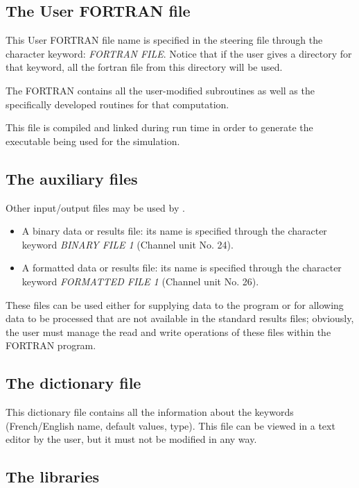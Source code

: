 \subsection{ The User FORTRAN file}

 This User FORTRAN file name is specified in the steering file through the character keyword: \textit{FORTRAN FILE}. Notice that if the user gives a directory for that keyword, all the fortran file from this directory will be used.  

 The FORTRAN contains all the user-modified \tomawac subroutines as well as the specifically developed routines for that computation.

 This file is compiled and linked during run time in order to generate the executable being used for the simulation.


\subsection{ The auxiliary files}

 Other input/output files may be used by \tomawac.

\begin{itemize}
\item  A binary data or results file: its name is specified through the character keyword \textit{BINARY FILE 1} (Channel unit No. 24).
\item  A formatted data or results file: its name is specified through the character keyword \textit{FORMATTED FILE 1} (Channel unit No. 26).
\end{itemize}

 These files can be used either for supplying data to the program or for allowing data to be processed that are not available in the standard results files; obviously, the user must manage the read and write operations of these files within the FORTRAN program.


\subsection{ The dictionary file}

 This dictionary file contains all the information about the keywords (French/English name, default values, type). This file can be viewed in a text editor by the user, but it must not be modified in any way.


\subsection{ The libraries}

